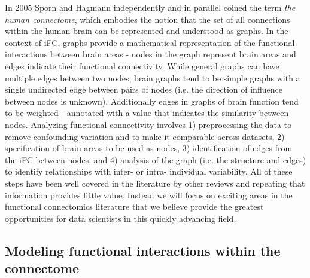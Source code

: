 In 2005 Sporn and Hagmann \cite{Sporns2005,Hagmann2005} independently and in parallel coined the term \textit{the human connectome}, which embodies the notion that the set of all connections within the human brain can be represented and understood as graphs. In the context of iFC, graphs provide a mathematical representation of the functional interactions between brain areas -  nodes in the graph represent brain areas and edges indicate their functional connectivity. While general graphs can have multiple edges between two nodes, brain graphs tend to be simple graphs with a single undirected edge between pairs of nodes (i.e. the direction of influence between nodes is unknown). Additionally edges in graphs of brain function tend to be weighted - annotated with a value that indicates the similarity between nodes. Analyzing functional connectivity involves 1) preprocessing the data to remove confounding variation and to make it comparable across datasets, 2) specification of brain areas to be used as nodes, 3) identification of edges from the iFC between nodes, and 4) analysis of the graph (i.e. the structure and edges) to identify relationships with inter- or intra- individual variability. All of these steps have been well covered in the literature by other reviews\cite{Craddock2013,Kelly2012,Varoquaux2013} and repeating that information provides little value. Instead we will focus on exciting areas in the functional connectomics literature that we believe provide the greatest opportunities for data scientists in this quickly advancing field.

\subsection{Modeling functional interactions within the connectome}

